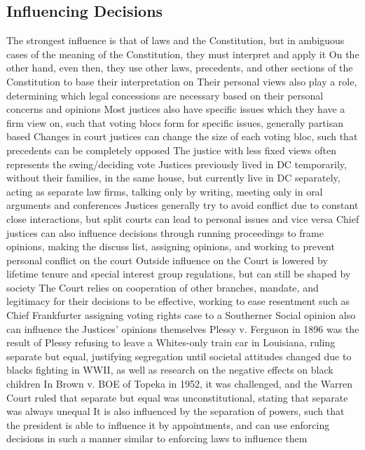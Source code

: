 \documentclass[11 pt, twoside]{article}
\newenvironment{outline*}
{
	\begin{outline}[enumerate]
	}
	{\end{outline}
}
\begin{document}
\subsection{Influencing Decisions}
\begin{outline*}
\1 The strongest influence is that of laws and the Constitution, but in ambiguous cases of the meaning of the Constitution, they must interpret and apply it
\2 On the other hand, even then, they use other laws, precedents, and other sections of the Constitution to base their interpretation on
\1 Their personal views also play a role, determining which legal concessions are necessary based on their personal concerns and opinions
\2 Most justices also have specific issues which they have a firm view on, such that voting blocs form for specific issues, generally partisan based
\2 Changes in court justices can change the size of each voting bloc, such that precedents can be completely opposed
\2 The justice with less fixed views often represents the swing/deciding vote
\1 Justices previously lived in DC temporarily, without their families, in the same house, but currently live in DC separately, acting as separate law firms, talking only by writing, meeting only in oral arguments and conferences
\2 Justices generally try to avoid conflict due to constant close interactions, but split courts can lead to personal issues and vice versa
\2 Chief justices can also influence decisions through running proceedings to frame opinions, making the discuss list, assigning opinions, and working to prevent personal conflict on the court
\1 Outside influence on the Court is lowered by lifetime tenure and special interest group regulations, but can still be shaped by society
\2 The Court relies on cooperation of other branches, mandate, and legitimacy for their decisions to be effective, working to ease resentment such as Chief Frankfurter assigning voting rights case to a Southerner
\2 Social opinion also can influence the Justices’ opinions themselves
\2 Plessy v. Ferguson in 1896 was the result of Plessy refusing to leave a Whites-only train car in Louisiana, ruling separate but equal, justifying segregation until societal attitudes changed due to blacks fighting in WWII, as well as research on the negative effects on black children
\2 In Brown v. BOE of Topeka in 1952, it was challenged, and the Warren Court ruled that separate but equal was unconstitutional, stating that separate was always unequal
\1 It is also influenced by the separation of powers, such that the president is able to influence it by appointments, and can use enforcing decisions in such a manner similar to enforcing laws to influence them

\end{outline*}
\end{document}
